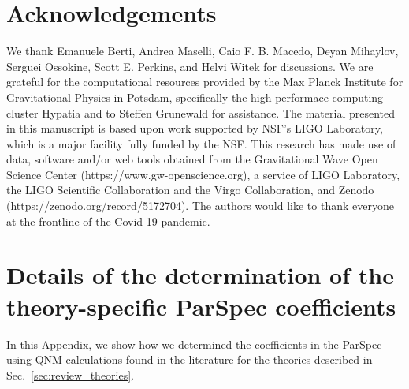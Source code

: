 \documentclass[twocolumn,
               prd,
               aps,
               superscriptaddress,
               tightenlines,
               nofootinbib,
               eqsecnum,
               amsfonts,
               amsmath,
               longbibliography]{revtex4-1}
\newcommand{\hs}[1]{{\textcolor{TealBlue}{{#1}}}}
\begin{document}
%


\section*{Acknowledgements}
\label{sec:acknowledgements}
%
We thank Emanuele Berti, Andrea Maselli, Caio F. B. Macedo, Deyan Mihaylov,
Serguei Ossokine, Scott E. Perkins, and Helvi Witek for discussions.
%
We are grateful for the computational resources provided by the Max Planck
Institute for Gravitational Physics in Potsdam, specifically the
high-performace computing cluster Hypatia and to Steffen Grunewald for
assistance.
%
The material presented in this manuscript is based upon work supported by NSF’s LIGO Laboratory,
which is a major facility fully funded by the NSF.
%
This research has made use of data, software and/or web tools obtained from the Gravitational Wave Open
Science Center (https://www.gw-openscience.org), a service of LIGO Laboratory, the LIGO Scientific Collaboration
and the Virgo Collaboration, and Zenodo (https://zenodo.org/record/5172704).
%
The authors would like to thank everyone at the frontline of the Covid-19
pandemic.

\appendix

\section{Details of the determination of the theory-specific ParSpec coefficients}
\label{app:map_details}

In this Appendix, we show how we determined the coefficients in the ParSpec
using QNM calculations found in the literature for the theories described in
Sec.~\ref{sec:review_theories}.
\end{document}
